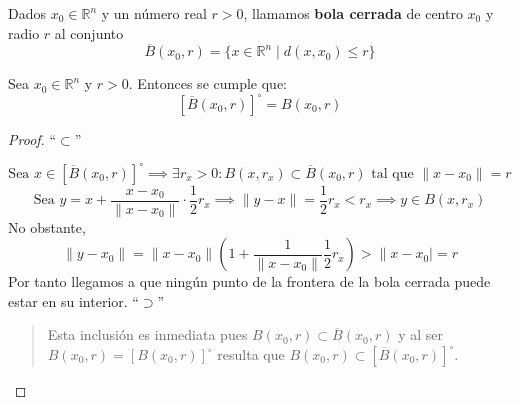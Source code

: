 \begin{definición}
    Dados $x_0 \in \mathbb{R}^n$ y un número real $r > 0$, llamamos \textbf{bola cerrada} de centro $x_0$ y radio $r$ al conjunto
    $$\overline{B}(x_0, r) = \{x \in \mathbb{R}^n \mid d(x, x_0) \leq r\}$$
\end{definición}
\begin{proposición}
    Sea $x_0 \in \mathbb{R}^n$ y $r > 0$. Entonces se cumple que: 
    $$[\overline{B}(x_0, r)]^\circ = B(x_0, r)$$
\end{proposición}
\begin{proof}
    ``$\subset$''

    $$ \text{Sea } x \in [\overline{B}(x_0, r)]^\circ \implies \exists r_x > 0 : B(x, r_x) \subset \overline{B}(x_0, r) \text{ tal que } \|x - x_0\| = r$$
    $$\text{Sea } y = x + \frac{x - x_0}{\|x - x_0\|} \cdot \frac{1}{2} r_x \implies \|y - x\| = \frac{1}{2} r_x < r_x \implies y \in B(x, r_x)$$ 
    No obstante, 
    $$\|y- x_0\| = \|x- x_0\|\left(1 + \frac{1}{\|x - x_0\|}\frac{1}{2}r_x\right) > \|x - x_0| = r$$ 
    Por tanto llegamos a que ningún punto de la frontera de la bola cerrada puede estar en su interior.
    ``$\supset$''
    \begin{quote}
    Esta inclusión es inmediata pues $B(x_0, r) \subset \overline{B}(x_0, r)$ y al ser $B(x_0, r) = \left[B(x_0, r)\right]^{\circ}$ resulta que $B(x_0, r) \subset \left[\overline{B}(x_0, r)\right]^{\circ}$.
    \end{quote}
\end{proof}

